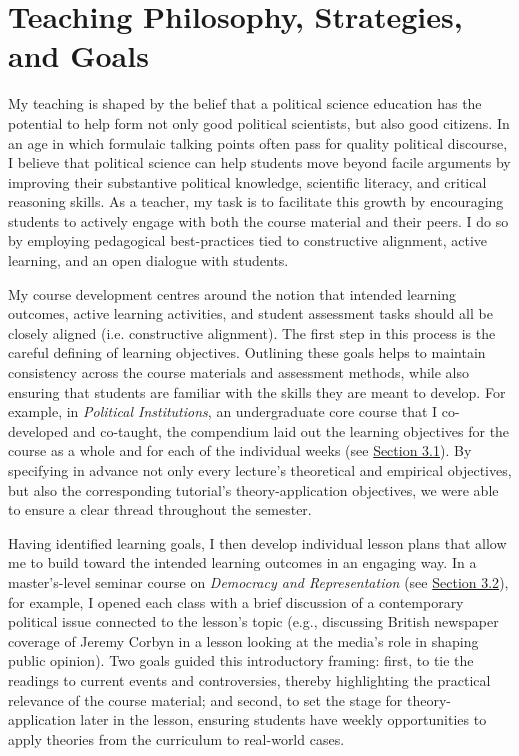 \documentclass[11pt]{article}
\begin{document}
	\section{ Teaching Philosophy, Strategies, and Goals}

	My teaching is shaped by the belief that a political science education has the potential to help form not only good political scientists, but also good citizens. In an age in which formulaic talking points often pass for quality political discourse, I believe that political science can help students move beyond facile arguments by improving their substantive political knowledge, scientific literacy, and critical reasoning skills. As a teacher, my task is to facilitate this growth by encouraging students to actively engage with both the course material and their peers. I do so by employing pedagogical best-practices tied to constructive alignment, active learning, and an open dialogue with students.

	My course development centres around the notion that intended learning outcomes, active learning activities, and student assessment tasks should all be closely aligned (i.e. constructive alignment). The first step in this process is the careful defining of learning objectives. Outlining these goals helps to maintain consistency across the course materials and assessment methods, while also ensuring that students are familiar with the skills they are meant to develop. For example, in \textit{Political Institutions}, an undergraduate core course that I co-developed and co-taught, the compendium laid out the learning objectives for the course as a whole and for each of the individual weeks (see \hyperref[sec:compendium]{Section 3.1}). By specifying in advance not only every lecture's theoretical and empirical objectives, but also the corresponding tutorial's theory-application objectives, we were able to ensure a clear thread throughout the semester. 

	Having identified learning goals, I then develop individual lesson plans that allow me to build toward the intended learning outcomes in an engaging way. In a master's-level seminar course on \textit{Democracy and Representation}  (see \hyperref[sec:syllabus]{Section 3.2}), for example, I opened each class with a brief discussion of a contemporary political issue connected to the lesson's topic (e.g., discussing British newspaper coverage of Jeremy Corbyn in a lesson looking at the media's role in shaping public opinion). Two goals guided this introductory framing: first, to tie the readings to current events and controversies, thereby highlighting the practical relevance of the course material; and second, to set the stage for theory-application later in the lesson, ensuring students have weekly opportunities to apply theories from the curriculum to real-world cases. 
\end{document}
